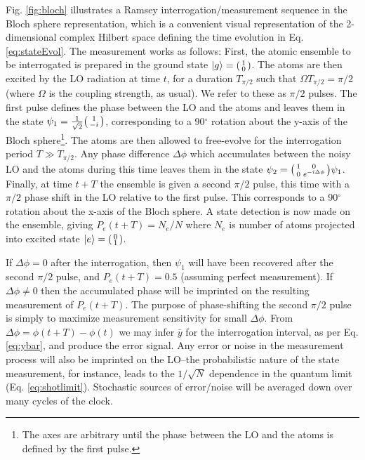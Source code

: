Fig. \ref{fig:bloch} illustrates a Ramsey interrogation/measurement sequence in the Bloch sphere representation, which is a convenient visual representation of the 2-dimensional complex Hilbert space defining the time evolution in Eq. \ref{eq:stateEvol}. The measurement works as follows: First, the atomic ensemble to be interrogated is prepared in the ground state $|g\rangle = \begin{psmallmatrix} 1 \\ 0 \end{psmallmatrix}$. The atoms are then excited by the LO radiation at time $t$, for a duration $T_{\pi/2}$ such that $\Omega T_{\pi/2} = \pi / 2$ (where $\Omega$ is the coupling strength, as usual). We refer to these as $\pi/2$ pulses. The first pulse defines the phase between the LO and the atoms and leaves them in the state $\psi_1 = \frac{1}{\sqrt{2}} \begin{psmallmatrix}1 \\ -i \end{psmallmatrix}$, corresponding to a 90$^{\circ}$ rotation about the y-axis of the Bloch sphere\footnote{The axes are arbitrary until the phase between the LO and the atoms is defined by the first pulse.}. The atoms are then allowed to free-evolve for the interrogation period $T \gg T_{\pi/2}$. Any phase difference $\Delta \phi$ which accumulates between the noisy LO and the atoms during this time leaves them in the state $\psi_2 = \begin{psmallmatrix}1 & 0 \\ 0 & e^{-i \Delta \phi} \end{psmallmatrix} \psi_1$. Finally, at time $t + T$ the ensemble is given a second $\pi /2$ pulse, this time with a $\pi / 2$ phase shift in the LO relative to the first pulse. This corresponds to a 90$^{\circ}$ rotation about the x-axis of the Bloch sphere. A state detection is now made on the ensemble, giving
 $P_e(t+T) = N_e / N$ where $N_e$ is number of atoms projected into excited state $|e\rangle = \begin{psmallmatrix}0\\1 \end{psmallmatrix}$.

If $\Delta \phi = 0$ after the interrogation, then $\psi_1$ will have been recovered after the second $\pi / 2$ pulse, and $P_e(t+T) = 0.5$  (assuming perfect measurement). If $\Delta \phi \neq 0$ then the accumulated phase will be imprinted on the resulting measurement of $P_e(t+T)$. The purpose of phase-shifting the second $\pi / 2$ pulse is simply to maximize measurement sensitivity for small $\Delta \phi$.  From $\Delta \phi = \phi (t+T) - \phi (t)$ we may infer $\bar{y}$ for the interrogation interval, as per Eq. \ref{eq:ybar}, and produce the error signal. Any error or noise in the measurement process will also be imprinted on the LO--the probabilistic nature of the state measurement, for instance, leads to the $1/\sqrt{N}$ dependence in the quantum limit (Eq. \ref{eq:shotlimit}). Stochastic sources of error/noise will be averaged down over many cycles of the clock. %


